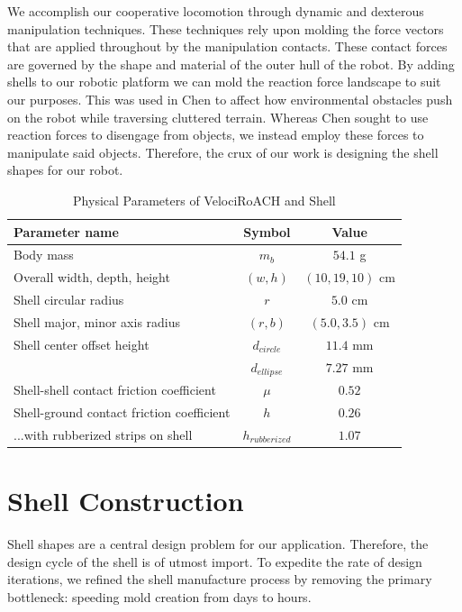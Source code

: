 \documentclass[letterpaper]{report}
\begin{document}
We accomplish our cooperative locomotion through dynamic and dexterous manipulation techniques.
These techniques rely upon molding the force vectors that are applied throughout by the manipulation contacts.
These contact forces are governed by the shape and material of the outer hull of the robot.
By adding shells to our robotic platform we can mold the reaction force landscape to suit our purposes.
This was used in Chen \cite{ChenTerradynamic} to affect how environmental obstacles push on the robot while traversing cluttered terrain.
Whereas Chen sought to use reaction forces to disengage from objects, we instead employ these forces to manipulate said objects.
Therefore, the crux of our work is designing the shell shapes for our robot.

\begin{table}[tb]
\renewcommand{\arraystretch}{1.1}
\caption{Physical Parameters of VelociRoACH and Shell}
\label{tab:Dimensions1}
\centering
\begin{tabular}{l c c}
\hline
Parameter name & Symbol & Value \\
\hline
Body mass & $m_b$ & $54.1$ g \\
Overall width, depth, height & $(w, h)$ & $(10, 19, 10)$ cm \\
Shell circular radius & $r$ & $5.0$ cm \\
Shell major, minor axis radius & $(r, b)$ & $(5.0, 3.5)$ cm \\
Shell center offset height & $d_{circle}$ & $11.4$ mm \\
                           & $d_{ellipse}$ & $7.27$ mm \\
Shell-shell contact friction coefficient & $\mu$ & $0.52$ \\
Shell-ground contact friction coefficient & $h$ & $0.26$ \\
...with rubberized strips on shell  & $h_{rubberized}$ & $1.07$ \\
\hline
\end{tabular}
\end{table}

\section{Shell Construction}
Shell shapes are a central design problem for our application. Therefore, the design cycle of the shell is of utmost import.
To expedite the rate of design iterations, we refined the shell manufacture process by removing the primary bottleneck: speeding mold creation from days to hours.
\end{document}

